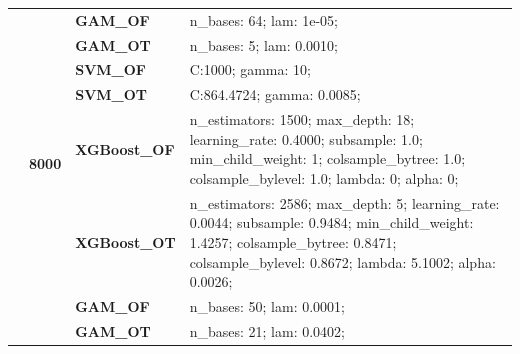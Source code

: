 \documentclass[runningheads]{llncs}
\begin{document}
\begin{table}
\begin{tabularx}{\textwidth}{>{\RaggedRight\arraybackslash}m{1.6cm}p{1.225cm}p{2.05cm}>{\RaggedRight\arraybackslash}X}
        \cline{2-4}
        \textbf{}                               & \multirow[t]{7}{*}{\textbf{8000}} & \textbf{GAM\_OF}     & n\_bases: 64; lam: 1e-05;                                                                                                                                                                         \\
        \textbf{}                               & \textbf{}                         & \textbf{GAM\_OT}     & n\_bases: 5; lam: 0.0010;                                                                                                                                                                         \\
        \textbf{}                               & \textbf{}                         & \textbf{SVM\_OF}     & C:\@1000; gamma: 10;                                                                                                                                                                              \\
        \textbf{}                               & \textbf{}                         & \textbf{SVM\_OT}     & C:\@864.4724; gamma: 0.0085;                                                                                                                                                                      \\
        \textbf{}                               & \textbf{}                         & \textbf{XGBoost\_OF} & n\_estimators: 1500; max\_depth: 18; learning\_rate: 0.4000; subsample: 1.0; min\_child\_weight: 1; colsample\_bytree: 1.0; colsample\_bylevel: 1.0; lambda: 0; alpha: 0;                         \\
        \textbf{}                               & \textbf{}                         & \textbf{XGBoost\_OT} & n\_estimators: 2586; max\_depth: 5; learning\_rate: 0.0044; subsample: 0.9484; min\_child\_weight: 1.4257; colsample\_bytree: 0.8471; colsample\_bylevel: 0.8672; lambda: 5.1002; alpha: 0.0026;  \\
        \cline{1-4}
        \multirow[t]{14}{=}{\textbf{Friedman1}} & \multirow[t]{7}{*}{\textbf{1000}} & \textbf{GAM\_OF}     & n\_bases: 50; lam: 0.0001;                                                                                                                                                                        \\
        \textbf{}                               & \textbf{}                         & \textbf{GAM\_OT}     & n\_bases: 21; lam: 0.0402;                                                                                                                                                                        \\

\end{tabularx}
\end{table}
\end{document}
